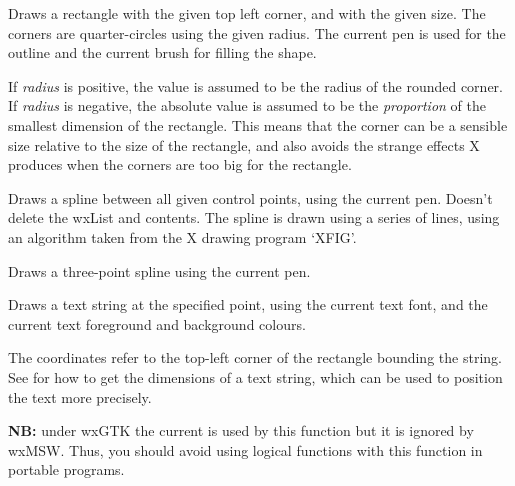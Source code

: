 
Draws a rectangle with the given top left corner, and with the given
size.  The corners are quarter-circles using the given radius. The
current pen is used for the outline and the current brush for filling
the shape.

If {\it radius} is positive, the value is assumed to be the
radius of the rounded corner. If {\it radius} is negative,
the absolute value is assumed to be the {\it proportion} of the smallest
dimension of the rectangle. This means that the corner can be
a sensible size relative to the size of the rectangle, and also avoids
the strange effects X produces when the corners are too big for
the rectangle.

\label{wxdcdrawspline}


Draws a spline between all given control points, using the current
pen.  Doesn't delete the wxList and contents. The spline is drawn
using a series of lines, using an algorithm taken from the X drawing
program `XFIG'.


Draws a three-point spline using the current pen.



\label{wxdcdrawtext}


Draws a text string at the specified point, using the current text font,
and the current text foreground and background colours.

The coordinates refer to the top-left corner of the rectangle bounding
the string. See  for how
to get the dimensions of a text string, which can be used to position the
text more precisely.

{\bf NB:} under wxGTK the current 
 is used by this function
but it is ignored by wxMSW. Thus, you should avoid using logical functions
with this function in portable programs.

